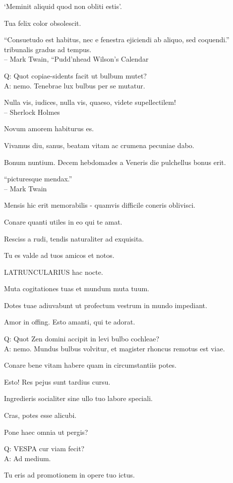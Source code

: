 \documentclass[titlepage,12pt]{memoir}
\begin{document}
‘Meminit aliquid quod non obliti estis’.

Tua felix color obsolescit.

“Consuetudo est habitus, nec e fenestra ejiciendi ab aliquo, sed coquendi.”
tribunalis gradus ad tempus.
\\-- Mark Twain, “Pudd’nhead Wilson’s Calendar

Q: Quot copiae-sidents facit ut bulbum mutet?\\
A: nemo. Tenebrae lux bulbus per se mutatur.

Nulla vis, iudices, nulla vis, quaeso, videte supellectilem!
\\-- Sherlock Holmes

Novum amorem habiturus es.

Vivamus diu, sanus, beatam vitam ac crumena pecuniae dabo.

Bonum nuntium. Decem hebdomades a Veneris die pulchellus bonus erit.

“picturesque mendax.”
\\-- Mark Twain

Mensis hic erit memorabilis - quamvis difficile coneris oblivisci.

Conare quanti utiles in eo qui te amat.

Resciss a rudi, tendis naturaliter ad exquisita.

Tu es valde ad tuos amicos et notos.

LATRUNCULARIUS hac nocte.

Muta cogitationes tuas et mundum muta tuum.

Dotes tuae adiuvabunt ut profectum vestrum in mundo impediant.

Amor in offing. Esto amanti, qui te adorat.

Q: Quot Zen domini accipit in levi bulbo cochleae?\\
A: nemo. Mundus bulbus volvitur, et magister rhoncus remotus est
viae.

Conare bene vitam habere quam in circumstantiis potes.

Esto! Res pejus sunt tardius cursu.

 Ingredieris socialiter sine ullo tuo labore speciali.

Cras, potes esse alicubi.

Pone haec omnia ut pergis?

Q: VESPA cur viam fecit?\\
A: Ad medium.

Tu eris ad promotionem in opere tuo ictus.
\end{document}

